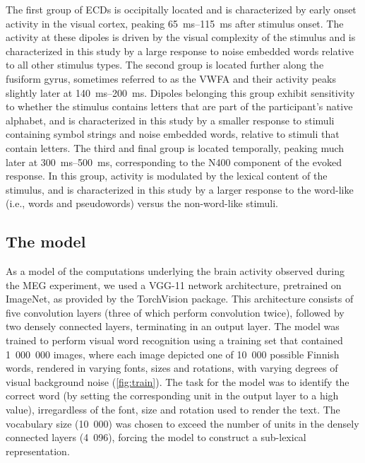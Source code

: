 \documentclass[a4paper, 10pt]{vanvliet_paper}
\begin{document}
The first group of \glspl{ECD} is occipitally located and is characterized by early onset activity in the visual cortex, peaking \SIrange{65}{115}{\milli\second} after stimulus onset.
The activity at these dipoles is driven by the visual complexity of the stimulus and is characterized in this study by a large response to noise embedded words relative to all other stimulus types.
The second group is located further along the fusiform gyrus, sometimes referred to as the \gls{VWFA}\cite{Cohen2004} and their activity peaks slightly later at \SIrange{140}{200}{\milli\second}.
Dipoles belonging this group exhibit sensitivity to whether the stimulus contains letters that are part of the participant's native alphabet\cite{Tarkiainen1999}, and is characterized in this study by a smaller response to stimuli containing symbol strings and noise embedded words, relative to stimuli that contain letters.
The third and final group is located temporally, peaking much later at \SIrange{300}{500}{\milli\second}, corresponding to the N400 component of the evoked response\cite{Halgren2002, Helenius1998b, Service2007}.
In this group, activity is modulated by the lexical content of the stimulus, and is characterized in this study by a larger response to the word-like (i.e., words and pseudowords) versus the non-word-like stimuli.

\subsection{The model}

As a model of the computations underlying the brain activity observed during the \gls{MEG} experiment, we used a \textsc{VGG}-11\cite{Szegedy2015} network architecture, pretrained on ImageNet\cite{Russakovsky2015}, as provided by the TorchVision package\cite{Marcel2010}.
This architecture consists of five convolution layers (three of which perform convolution twice), followed by two densely connected layers, terminating in an output layer.
The model was trained to perform visual word recognition using a training set that contained 1~000~000 images, where each image depicted one of 10~000 possible Finnish words, rendered in varying fonts, sizes and rotations, with varying degrees of visual background noise (\autoref{fig:train}).
The task for the model was to identify the correct word (by setting the corresponding unit in the output layer to a high value), irregardless of the font, size and rotation used to render the text.
The vocabulary size (10~000) was chosen to exceed the number of units in the densely connected layers (4~096), forcing the model to construct a sub-lexical representation.
\end{document}
